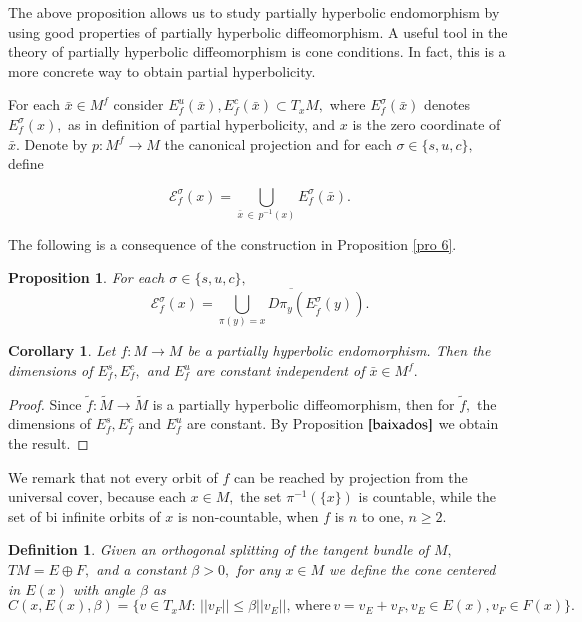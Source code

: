 \documentclass[12pt,reqno]{amsart}
\numberwithin{equation}{section}
\theoremstyle{plain}
\newtheorem{corollary}[theorem]{Corollary}
\newtheorem{proposition}[theorem]{Proposition}
\newtheorem{definition}[theorem]{Definition}
\theoremstyle{remark}
\begin{document}
The above proposition allows us to study partially hyperbolic endomorphism by using good properties of partially hyperbolic diffeomorphism. A useful tool in the theory of partially hyperbolic diffeomorphism is cone conditions. In fact, this is a more concrete way to obtain partial hyperbolicity.

For each $\bar{x}\in M^f$ consider $E^u_f(\bar{x}),E^c_f(\bar{x})\subset T_xM,$ where $E^{\sigma}_f(\bar{x})$ denotes $E^{\sigma}_f(x) ,$ as in definition of partial hyperbolicity, and $x$ is the zero coordinate of $\bar{x}.$ Denote by $p:M^f\rightarrow M$ the canonical projection and for each $\sigma\in\{s,u,c\},$ define

$$
\mathcal{E}^{\sigma}_f(x)=\displaystyle\bigcup_{\bar{x}\,\in\, p^{-1}(x)} E^{\sigma}_f(\bar{x}).
$$

The following is a consequence of the construction in Proposition \ref{pro 6}.


\begin{proposition}\label{baixados}
For each $\sigma\in\{s,u,c\},$
$$
\mathcal{E}^{\sigma}_f(x)=\overline{\displaystyle\bigcup_{\pi(y)=x}D\pi_y(E^{\sigma}_{\widetilde{f}}(y))}.
$$
\end{proposition}


 \begin{corollary}
 Let $f: M \rightarrow M$ be a partially hyperbolic endomorphism. Then the dimensions of $E^s_f, E^c_f,$ and $E^u_f$ are constant independent of $\bar{x} \in M^f.$
 \end{corollary}

\begin{proof}
Since $\widetilde{f}: \widetilde{M} \rightarrow \widetilde{M}$ is a partially hyperbolic diffeomorphism, then for $\widetilde{f},$ the dimensions of $E^s_f, E^c_f$ and $E^u_f$ are constant.  By Proposition $\ref{baixados}$  we obtain the result.
\end{proof}



We remark that not every orbit of $f$ can be reached by projection from the universal cover, because each $x \in M,$ the set $\pi^{-1}(\{x\})$ is countable, while the set  of bi infinite orbits of $x$ is non-countable, when $f$ is $n$ to one, $n \geq 2.$


\begin{definition}
Given an orthogonal splitting of the tangent bundle of $M,$ $TM=E\oplus F,$ and a constant $\beta>0,$
for any $x\in M$ we define the cone centered in $E(x)$ with angle $\beta$ as
$$
C(x, E(x), \beta)=\{v\in T_xM:\, ||v_F||\leq\beta ||v_E||,\, \mbox{where}\,v=v_E+v_F, v_E\in E(x), v_F\in F(x)  \}.
$$
\end{definition}
\end{document}
